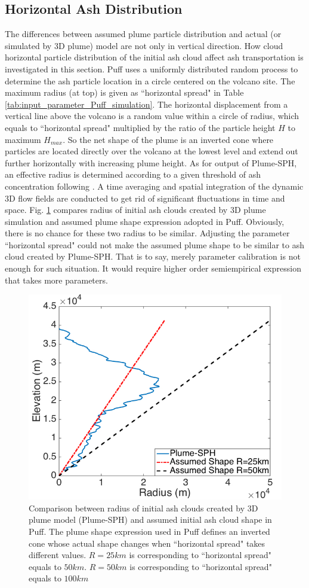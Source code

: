 \documentclass[draft,linenumbers]{agujournal2019}
\begin{document}
\subsection{Horizontal Ash Distribution}

The differences between assumed plume particle distribution and actual (or simulated by 3D plume) model are not only in vertical direction. How cloud horizontal particle distribution of the initial ash cloud affect ash transportation is investigated in this section. Puff uses a uniformly distributed random process to determine the ash particle location in a circle centered on the volcano site. The maximum radius (at top) is given as ``horizontal spread" in Table \ref{tab:input_parameter_Puff_simulation}. The horizontal displacement from a vertical line above the volcano is a random value within a circle of radius, which equals to ``horizontal spread" multiplied by the ratio of the particle height $H$ to maximum $H_{max}$. So the net shape of the plume is an inverted cone where particles are located directly over the volcano at the lowest level and extend out further horizontally with increasing plume height. As for output of Plume-SPH, an effective radius is determined according to a given threshold of ash concentration following \citet {cerminara2016large}. A time averaging and spatial integration of the dynamic 3D flow fields are conducted to get rid of significant fluctuations in time and space. Fig. \ref{fig:radius-comparison} compares radius of initial ash clouds created by 3D plume simulation and assumed plume shape expression adopted in Puff. Obviously, there is no chance for these two radius to be similar. Adjusting the parameter ``horizontal spread" could not make the assumed plume shape to be similar to ash cloud created by Plume-SPH. That is to say, merely parameter calibration is not enough for such situation. It would require higher order semiempirical expression that takes more parameters.

\begin{figure}[!htb]
   \centering
   \includegraphics[width=0.50 \textwidth]{Figures/radius-Plume-SPH-And-Assumed}  
   \caption{Comparison between radius of initial ash clouds created by 3D plume model (Plume-SPH) and assumed initial ash cloud shape in Puff. The plume shape expression used in Puff defines an inverted cone whose actual shape changes when ``horizontal spread" takes different values. $R=25km$ is corresponding to ``horizontal spread" equals to $50km$. $R=50km$ is corresponding to ``horizontal spread" equals to $100km$}
    \label{fig:radius-comparison}
\end{figure}
\end{document}
